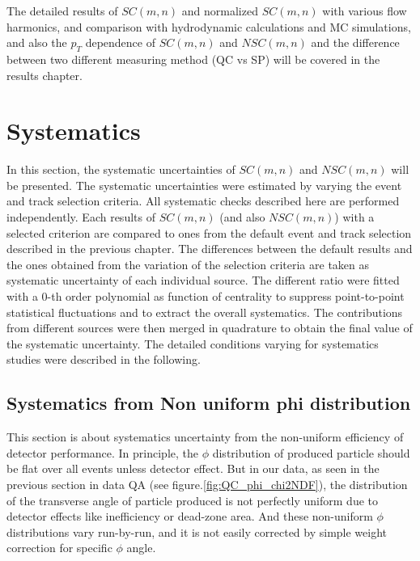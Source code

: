 \vskip15mm

The detailed results of $SC(m,n)$ and normalized $SC(m,n)$ with various flow harmonics, and comparison with hydrodynamic calculations and MC simulations, and also the $p_T$ dependence of $SC(m,n)$ and $NSC(m,n)$ and the difference between two different measuring method (QC vs SP) will be covered in the results chapter.

\section{Systematics}

	In this section, the systematic uncertainties of $SC(m,n)$ and  $NSC(m,n)$ will be presented. The systematic uncertainties were estimated by varying the event and track selection criteria. All systematic checks described here are performed independently. Each results of $SC(m,n)$ (and also $NSC(m,n)$) with a selected criterion are compared to ones from the default event and track selection described in the previous chapter. The differences between the default results and the ones obtained from the variation of the selection criteria are taken as systematic uncertainty of each individual source.
The different ratio were fitted with a 0-th order polynomial as function of centrality to suppress point-to-point statistical fluctuations and to extract the overall systematics. The contributions from different sources were then merged in quadrature to obtain the final value of the systematic uncertainty. The detailed conditions varying for systematics studies were described in the following.
	
	
	
\subsection{Systematics from Non uniform phi distribution}
	
	
This section is about systematics uncertainty from the non-uniform efficiency of detector performance. In principle, the $\phi$ distribution of produced particle should be flat over all events unless detector effect. But in our data, as seen in the previous section in data QA (see figure.\ref{fig:QC_phi_chi2NDF}), the distribution of the transverse angle of particle produced is not perfectly uniform due to detector effects like inefficiency or dead-zone area. And these non-uniform $\phi$ distributions vary run-by-run, and it is not easily corrected by simple weight correction for specific $\phi$ angle.

